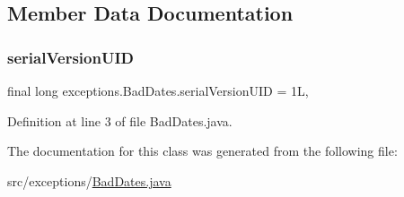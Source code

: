 \subsection{Member Data Documentation}
\mbox{\label{classexceptions_1_1BadDates_a1703e41273cdde53ece45e307839c449}} 
\subsubsection{\texorpdfstring{serialVersionUID}{serialVersionUID}}
{\footnotesize\ttfamily final long exceptions.\+Bad\+Dates.\+serial\+Version\+U\+ID = 1L\hspace{0.3cm}{\ttfamily [static]}, {\ttfamily [private]}}



Definition at line 3 of file Bad\+Dates.\+java.



The documentation for this class was generated from the following file\+:\begin{DoxyCompactItemize}
\item 
src/exceptions/\mbox{\hyperlink{BadDates_8java}{Bad\+Dates.\+java}}\end{DoxyCompactItemize}
